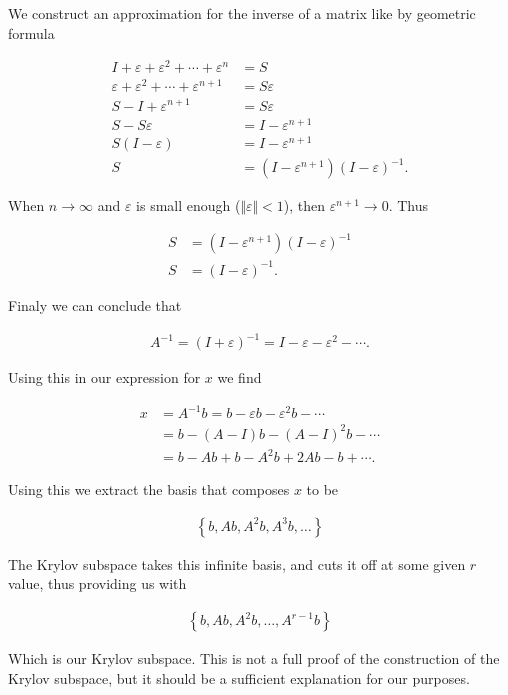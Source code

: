 \documentclass[../fem.tex]{subfiles}
\begin{document}
We construct an approximation for the inverse of a matrix like by geometric
formula

\begin{align*}
  I+\varepsilon+\varepsilon^2+\cdots+\varepsilon^n&=S\\
  \varepsilon+\varepsilon^2+\cdots+\varepsilon^{n+1}&=S\varepsilon\\
  S-I+\varepsilon^{n+1}&=S\varepsilon\\
  S-S\varepsilon&=I-\varepsilon^{n+1}\\
  S(I-\varepsilon)&=I-\varepsilon^{n+1}\\
  S&=\left(I-\varepsilon^{n+1}\right)\left(I-\varepsilon\right)^{-1}.
\end{align*}

When $n\rightarrow \infty$ and $\varepsilon$ is small enough
($\Vert\varepsilon\Vert < 1$), then $\varepsilon^{n+1}\rightarrow 0$. Thus

\begin{align*}
  S&=\left(I-\varepsilon^{n+1}\right)\left(I-\varepsilon\right)^{-1}\\
  S&=\left(I-\varepsilon\right)^{-1}.
\end{align*}

Finaly we can conclude that

\begin{align*}
  A^{-1}=(I+\varepsilon)^{-1}=I-\varepsilon-\varepsilon^2-\cdots.
\end{align*}

Using this in our expression for $x$ we find

\begin{align*}
  x&=A^{-1}b=b-\varepsilon b-\varepsilon^2 b - \cdots\\
   &=b-(A-I)b-(A-I)^2b-\cdots\\
   &=b-Ab+b-A^2b+2Ab-b+\cdots.
\end{align*}

Using this we extract the basis that composes $x$ to be

\begin{align*}
  \left\{b, Ab, A^2b, A^3b, \ldots\right\}
\end{align*}

The Krylov subspace takes this infinite basis, and cuts it off at some given
$r$ value, thus providing us with

\begin{align*}
  \left\{b,Ab,A^2b,\ldots,A^{r-1}b\right\}
\end{align*}

Which is our Krylov subspace. This is not a full proof of the construction of
the Krylov subspace, but it should be a sufficient explanation for our purposes.
\end{document}
